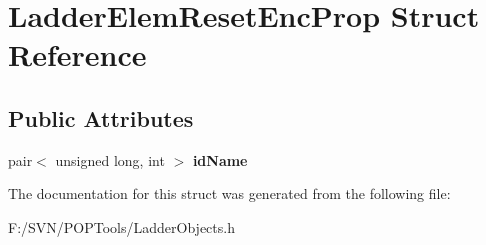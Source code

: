 \hypertarget{struct_ladder_elem_reset_enc_prop}{\section{Ladder\-Elem\-Reset\-Enc\-Prop Struct Reference}
\label{struct_ladder_elem_reset_enc_prop}
}
\subsection*{Public Attributes}
\begin{DoxyCompactItemize}
\item 
\hypertarget{struct_ladder_elem_reset_enc_prop_a7b1a46f1ca4ffb2f139fecac4febbfb9}{pair$<$ unsigned long, int $>$ {\bfseries id\-Name}}\label{struct_ladder_elem_reset_enc_prop_a7b1a46f1ca4ffb2f139fecac4febbfb9}

\end{DoxyCompactItemize}


The documentation for this struct was generated from the following file\-:\begin{DoxyCompactItemize}
\item 
F\-:/\-S\-V\-N/\-P\-O\-P\-Tools/Ladder\-Objects.\-h\end{DoxyCompactItemize}
